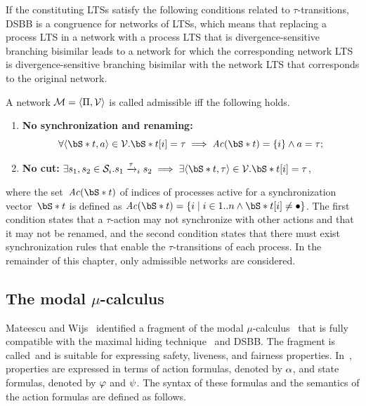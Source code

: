 If the constituting LTSs satisfy the following conditions related to $\tau$-transitions, DSBB is a congruence for networks of LTSs,
which means that replacing a process LTS in a network with a process LTS that is divergence-sensitive branching bisimilar leads to a network for which the corresponding network LTS is divergence-sensitive branching bisimilar with the network LTS that corresponds to the original network.

\begin{definition}
\label{def:lts-transformation:admissibility}
A network $\mathcal{M} = \langle \Pi, {\mathcal{V}} \rangle$ is called admissible iff the following holds.
\begin{enumerate}
\item \textbf{No synchronization and renaming:}
\[
\forall \syncruletuple \in \synchrules. \vectornot{t}[i] = \tau \implies {\it Ac}(\vectornot{t}) = \{i\} \wedge a=\tau;
\]
\item \textbf{No cut:} $\exists s_1, s_2 \in \states{i}. s_1\xrightarrow{\tau}_i s_2 \implies \exists \langle \vectornot{t}, \tau \rangle \in \synchrules. \vectornot{t}[i] = \tau$,
\end{enumerate}
\end{definition}

\noindent
where the set~${\it Ac}(\vectornot{t})$ of indices of processes active for a synchronization vector~$\vectornot{t}$ is defined as ${\it Ac}(\vectornot{t})= \{i \mid i \in 1..n \wedge \vectornot{t}[i] \neq \bullet \}$.
The first condition states that a $\tau$-action may not synchronize with other actions and that it may not be renamed, and the second condition states that there must exist synchronization rules that enable the $\tau$-transitions of each process.
In the remainder of this chapter, only admissible networks are considered.

\subsection{The modal $\mu$-calculus \dsbrLmu}
\label{subsec:lts-transformation:lmu}
Mateescu and Wijs~\cite{mateescu.wijs.propred} identified a fragment of the modal $\mu$-calculus~\cite{Kozen-83} that is fully compatible with the maximal hiding technique~\cite{mateescu.wijs.propred} and DSBB.
The fragment is called~\dsbrLmu and is suitable for expressing safety, liveness, and fairness properties.
In~\dsbrLmu, properties are expressed in terms of action formulas, denoted by $\alpha$, and state formulas, denoted by $\varphi$ and $\psi$.
The syntax of these formulas and the semantics of the action formulas are defined as follows.

